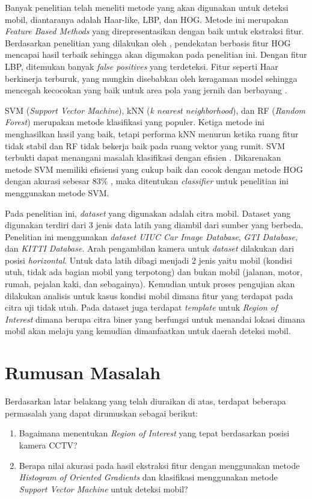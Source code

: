 Banyak penelitian telah meneliti metode yang akan digunakan untuk deteksi mobil, diantaranya adalah Haar-like, LBP, dan HOG. Metode ini merupakan \textit{Feature Based Methods} yang direpresentasikan dengan baik untuk ekstraksi fitur. Berdasarkan penelitian yang dilakukan oleh \cite{neumann}, pendekatan berbasis fitur HOG mencapai hasil terbaik sehingga akan digunakan pada penelitian ini. Dengan fitur LBP, ditemukan banyak \textit{false positives} yang terdeteksi. Fitur seperti Haar berkinerja terburuk, yang mungkin disebabkan oleh keragaman model sehingga mencegah kecocokan yang baik untuk area pola yang jernih dan berbayang \cite{neumann}.

SVM (\textit{Support Vector Machine}), kNN (\textit{k nearest neighborhood}), dan RF (\textit{Random Forest}) merupakan metode klasifikasi yang populer. Ketiga metode ini menghasilkan hasil yang baik, tetapi performa kNN menurun ketika ruang fitur tidak stabil dan RF tidak bekerja baik pada ruang vektor yang rumit. SVM terbukti dapat menangani masalah klasifikasi dengan efisien \cite{sajib}. Dikarenakan metode SVM memiliki efisiensi yang cukup baik dan cocok dengan metode HOG dengan akurasi sebesar 83\% \cite{shakin}, maka ditentukan \textit{classifier} untuk penelitian ini menggunakan metode SVM.

Pada penelitian ini, \textit{dataset} yang digunakan adalah citra mobil. Dataset yang digunakan terdiri dari 3 jenis data latih yang diambil dari sumber yang berbeda. Penelitian ini menggunakan \textit{dataset UIUC Car Image Database}, \textit{GTI Database}, dan \textit{KITTI Database}. Arah pengambilan kamera untuk \textit{dataset} dilakukan dari posisi \textit{horizontal}. Untuk data latih dibagi menjadi 2 jenis yaitu mobil (kondisi utuh, tidak ada bagian mobil yang terpotong) dan bukan mobil (jalanan, motor, rumah, pejalan kaki, dan sebagainya). Kemudian untuk proses pengujian akan dilakukan analisis untuk kasus kondisi mobil dimana fitur yang terdapat pada citra uji tidak utuh. Pada dataset juga terdapat \textit{template} untuk \textit{Region of Interest} dimana berupa citra biner yang berfungsi untuk menandai lokasi dimana mobil akan melaju yang kemudian dimanfaatkan untuk daerah deteksi mobil.
\\

\section{Rumusan Masalah}
Berdasarkan latar belakang yang telah diuraikan di atas, terdapat beberapa permasalah yang dapat dirumuskan sebagai berikut:
\begin{enumerate}[nolistsep,leftmargin=0.5cm]
	\item 
	Bagaimana menentukan \textit{Region of Interest} yang tepat berdasarkan posisi kamera CCTV?
	\item 
	Berapa nilai akurasi pada hasil ekstraksi fitur dengan menggunakan metode \textit{Histogram of Oriented Gradients} dan klasifikasi menggunakan metode \textit{Support Vector Machine} untuk deteksi mobil?
	\\
\end{enumerate}


